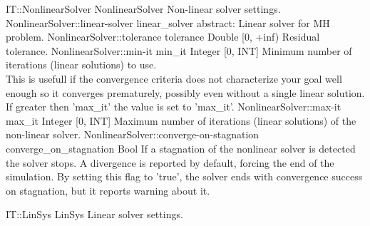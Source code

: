 \begin{RecordType}
	{IT::NonlinearSolver}
	{NonlinearSolver}
	{}%
	{}%
	{{{Non-linear solver settings.}%
}}
		\RecKey
			{NonlinearSolver::linear-solver}
			{linear{\_}solver}
			{{abstract: }}{}
			{ \ValueDefault{{\{}{\}}}}
			{{{Linear solver for MH problem.}%
}}
		\RecKey
			{NonlinearSolver::tolerance}
			{tolerance}
			{{Double [0, +inf)}}{}
			{ }
			{{{Residual tolerance.}%
}}
		\RecKey
			{NonlinearSolver::min-it}
			{min{\_}it}
			{{Integer [0, INT]}}{}
			{ }
			{{{Minimum number of iterations (linear solutions) to use.}\\{
This is usefull if the convergence criteria does not characterize your goal well enough so it converges prematurely, possibly even without a single linear solution.
If greater then 'max{\_}it' the value is set to 'max{\_}it'.}%
}}
		\RecKey
			{NonlinearSolver::max-it}
			{max{\_}it}
			{{Integer [0, INT]}}{}
			{ }
			{{{Maximum number of iterations (linear solutions) of the non-linear solver.}%
}}
		\RecKey
			{NonlinearSolver::converge-on-stagnation}
			{converge{\_}on{\_}stagnation}
			{{Bool}}{}
			{ }
			{{{If a stagnation of the nonlinear solver is detected the solver stops.
A divergence is reported by default, forcing the end of the simulation.
By setting this flag to 'true', the solver ends with convergence success on stagnation, but it reports warning about it.}%
}}
\end{RecordType}
\begin{AbstractType}
	{IT::LinSys}
	{LinSys}
	{}
	{{{Linear solver settings.}%
}}
\end{AbstractType}
